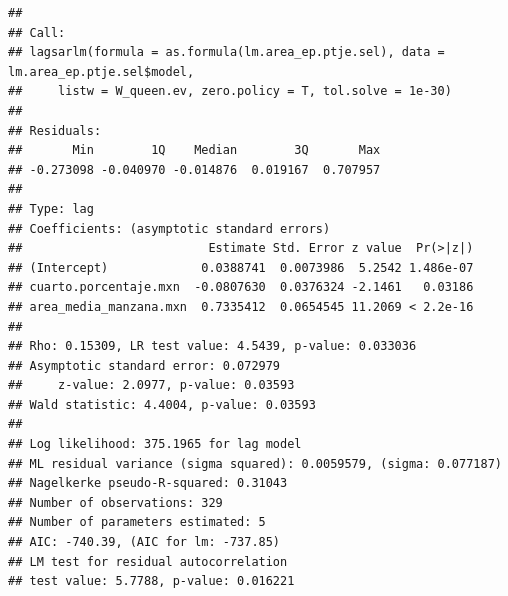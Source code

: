 \documentclass[12pt,]{book}
\newenvironment{Shaded}{\begin{snugshade}}{\end{snugshade}}
\newcommand{\KeywordTok}[1]{\textcolor[rgb]{0.13,0.29,0.53}{\textbf{#1}}}
\newcommand{\DataTypeTok}[1]{\textcolor[rgb]{0.13,0.29,0.53}{#1}}
\newcommand{\FloatTok}[1]{\textcolor[rgb]{0.00,0.00,0.81}{#1}}
\newcommand{\StringTok}[1]{\textcolor[rgb]{0.31,0.60,0.02}{#1}}
\newcommand{\CommentTok}[1]{\textcolor[rgb]{0.56,0.35,0.01}{\textit{#1}}}
\newcommand{\OperatorTok}[1]{\textcolor[rgb]{0.81,0.36,0.00}{\textbf{#1}}}
\newcommand{\NormalTok}[1]{#1}
\begin{document}
\begin{Shaded}
\end{Shaded}

\begin{verbatim}
## 
## Call:
## lagsarlm(formula = as.formula(lm.area_ep.ptje.sel), data = lm.area_ep.ptje.sel$model, 
##     listw = W_queen.ev, zero.policy = T, tol.solve = 1e-30)
## 
## Residuals:
##       Min        1Q    Median        3Q       Max 
## -0.273098 -0.040970 -0.014876  0.019167  0.707957 
## 
## Type: lag 
## Coefficients: (asymptotic standard errors) 
##                          Estimate Std. Error z value  Pr(>|z|)
## (Intercept)             0.0388741  0.0073986  5.2542 1.486e-07
## cuarto.porcentaje.mxn  -0.0807630  0.0376324 -2.1461   0.03186
## area_media_manzana.mxn  0.7335412  0.0654545 11.2069 < 2.2e-16
## 
## Rho: 0.15309, LR test value: 4.5439, p-value: 0.033036
## Asymptotic standard error: 0.072979
##     z-value: 2.0977, p-value: 0.03593
## Wald statistic: 4.4004, p-value: 0.03593
## 
## Log likelihood: 375.1965 for lag model
## ML residual variance (sigma squared): 0.0059579, (sigma: 0.077187)
## Nagelkerke pseudo-R-squared: 0.31043 
## Number of observations: 329 
## Number of parameters estimated: 5 
## AIC: -740.39, (AIC for lm: -737.85)
## LM test for residual autocorrelation
## test value: 5.7788, p-value: 0.016221
\end{verbatim}

\begin{Shaded}
\end{Shaded}
\end{document}
